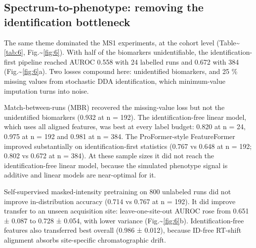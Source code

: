 \documentclass[pdflatex,sn-mathphys-num]{sn-jnl}
\begin{document}
\subsection{Spectrum-to-phenotype: removing the identification bottleneck}

The same theme dominated the MS1 experiments, at the cohort level (Table\textasciitilde{}\ref{tab:6}, Fig.\textasciitilde{}\ref{fig:6}). With half of the biomarkers unidentifiable, the identification-first pipeline reached AUROC 0.558 with 24 labelled runs and 0.672 with 384 (Fig.\textasciitilde{}\ref{fig:6}a). Two losses compound here: unidentified biomarkers, and 25 \% missing values from stochastic DDA identification, which minimum-value imputation turns into noise.

Match-between-runs (MBR) recovered the missing-value loss but not the unidentified biomarkers (0.932 at n = 192). The identification-free linear model, which uses all aligned features, was best at every label budget: 0.820 at n = 24, 0.975 at n = 192 and 0.981 at n = 384. The ProFormer-style FeatureFormer improved substantially on identification-first statistics (0.767 vs 0.648 at n = 192; 0.802 vs 0.672 at n = 384). At these sample sizes it did not reach the identification-free linear model, because the simulated phenotype signal is additive and linear models are near-optimal for it.

Self-supervised masked-intensity pretraining on 800 unlabeled runs did not improve in-distribution accuracy (0.714 vs 0.767 at n = 192). It did improve transfer to an unseen acquisition site: leave-one-site-out AUROC rose from 0.651 ± 0.087 to 0.728 ± 0.054, with lower variance (Fig.\textasciitilde{}\ref{fig:6}b). Identification-free features also transferred best overall (0.986 ± 0.012), because ID-free RT-shift alignment absorbs site-specific chromatographic drift.
\end{document}
